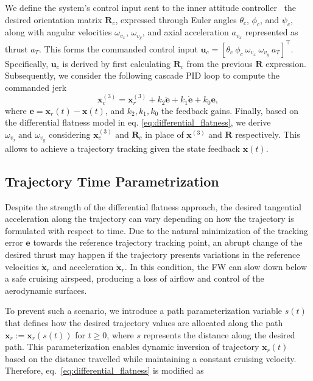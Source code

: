 We define the system's control input sent to the inner attitude controller~\cite{REINHARDT202191,Coates} the desired orientation matrix $\mathbf{R}_{c}$, expressed through Euler angles $\theta_c$, $\phi_c$, and $\psi_c$, along with angular velocities $\omega_{v_x}$, $\omega_{v_y}$, and axial acceleration $a_{v_x}$ represented as thrust $a_T$. This forms the commanded control input $\mathbf{u}_{c} = [\theta_c~\phi_c~\omega_{v_x}~\omega_{v_y}~a_T]^\top$. Specifically, $\mathbf{u}_{c}$ is derived by first calculating $\mathbf{R}_c$ from the previous $\mathbf{R}$ expression. Subsequently, we consider the following cascade PID loop to compute the commanded jerk
\begin{equation}
    \mathbf{x}_{c}^{(3)} = \mathbf{x}^{(3)}_{r} + k_2 \ddot{\mathbf{e}} + k_1 \dot{\mathbf{e}} + k_0 \mathbf{e},
\end{equation}
where $\mathbf{e} = \mathbf{x}_{r}(t) - \mathbf{x}(t)$, and $k_2, k_1, k_0$ the feedback gains. Finally, based on the differential flatness model in eq. \eqref{eq:differential_flatness},  we derive $\omega_{v_x}~\text{and~}\omega_{v_y}$ considering $\mathbf{x}_{c}^{(3)}$ and $\mathbf{R}_c$ in place of $\mathbf{x}^{(3)}$ and $\mathbf{R}$ respectively. This allows to achieve a trajectory tracking given the state feedback $\mathbf{x}(t)$.


\subsection{Trajectory Time Parametrization}
Despite the strength of the differential flatness approach, the  desired tangential acceleration along the trajectory can vary depending on how the trajectory is formulated with respect to time. Due to the natural minimization of the tracking error $\mathbf{e}$ towards the reference trajectory tracking point, an abrupt change of the desired thrust may happen if the trajectory presents variations in the reference velocities $\dot{\mathbf{x}}_{r}$ and acceleration $\ddot{\mathbf{x}}_{r}$.
In this condition, the FW can slow down below a safe cruising airspeed, producing a loss of airflow and control of the aerodynamic surfaces. 

To prevent such a scenario, we introduce a path parameterization variable $s(t)$ that defines how the desired trajectory values are allocated along the path $\mathbf{x}_{r}:= \mathbf{x}_{r}(s(t))$ for $t \geq 0$, where $s$ represents the distance along the desired path. This parameterization enables dynamic inversion of trajectory $\mathbf{x}_{r}(t) $ based on the distance travelled while maintaining a constant cruising velocity. Therefore, eq.~\eqref{eq:differential_flatness} is modified as 


